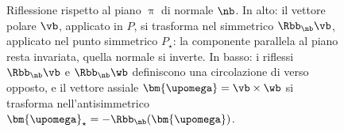\begin{figure}[!htbp]
	\caption{Riflessione rispetto al piano $\uppi$ di normale $\nb$. In alto:
		il vettore polare $\vb$, applicato in $P$, si trasforma nel simmetrico
		$\Rbb_{\nb}\vb$, applicato nel punto simmetrico $P_\star$: la componente
		parallela al piano resta invariata, quella normale si inverte. In basso:
		i riflessi $\Rbb_{\nb}\vb$ e $\Rbb_{\nb}\wb$ definiscono una circolazione
		di verso opposto, e il vettore assiale $\bm{\upomega}=\vb\times\wb$ si
		trasforma nell'antisimmetrico
		$\bm{\upomega}_\star=-\Rbb_{\nb}(\bm{\upomega})$.}
	\label{fig:riflessione}
\end{figure}
